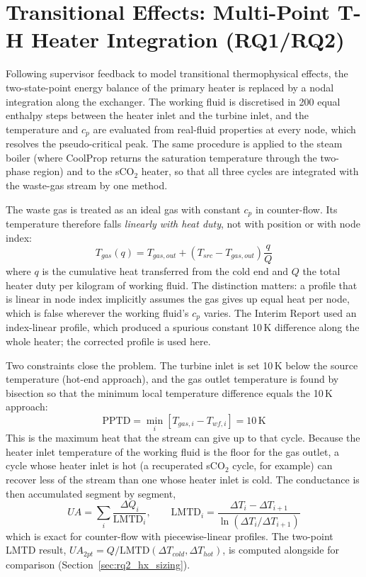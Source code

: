 \section{Transitional Effects: Multi-Point T-H Heater Integration (RQ1/RQ2)}
\label{sec:method_pinch}

Following supervisor feedback to model transitional thermophysical effects,
the two-state-point energy balance of the primary heater is replaced by a
nodal integration along the exchanger. The working fluid is discretised in
200 equal enthalpy steps between the heater inlet and the turbine inlet, and
the temperature and $c_p$ are evaluated from real-fluid properties at every
node, which resolves the pseudo-critical peak. The same procedure is applied
to the steam boiler (where CoolProp returns the saturation temperature
through the two-phase region) and to the sCO$_2$ heater, so that all three
cycles are integrated with the waste-gas stream by one method.

The waste gas is treated as an ideal gas with constant $c_p$ in counter-flow.
Its temperature therefore falls \emph{linearly with heat duty}, not with
position or with node index:
\begin{equation}
T_{gas}(q) = T_{gas,out} + \left(T_{src} - T_{gas,out}\right)\frac{q}{Q}
\label{eq:gas_profile}
\end{equation}
where $q$ is the cumulative heat transferred from the cold end and $Q$ the
total heater duty per kilogram of working fluid. The distinction matters: a
profile that is linear in node index implicitly assumes the gas gives up equal
heat per node, which is false wherever the working fluid's $c_p$ varies. The
Interim Report used an index-linear profile, which produced a spurious
constant 10\,K difference along the whole heater; the corrected profile is
used here.

Two constraints close the problem. The turbine inlet is set 10\,K below the
source temperature (hot-end approach), and the gas outlet temperature is
found by bisection so that the minimum local temperature difference equals
the 10\,K approach:
\begin{equation}
\mathrm{PPTD} = \min_{i}\!\left[T_{gas,i} - T_{wf,i}\right] = 10\,\text{K}
\label{eq:pptd}
\end{equation}
This is the maximum heat that the stream can give up to that cycle. Because
the heater inlet temperature of the working fluid is the floor for the gas
outlet, a cycle whose heater inlet is hot (a recuperated sCO$_2$ cycle, for
example) can recover less of the stream than one whose heater inlet is cold.
The conductance is then accumulated segment by segment,
\begin{equation}
UA = \sum_{i} \frac{\Delta Q_i}{\mathrm{LMTD}_i}, \qquad
\mathrm{LMTD}_i = \frac{\Delta T_{i} - \Delta T_{i+1}}{\ln(\Delta T_{i}/\Delta T_{i+1})}
\label{eq:seg_UA}
\end{equation}
which is exact for counter-flow with piecewise-linear profiles. The two-point
LMTD result, $UA_{2pt} = Q/\mathrm{LMTD}(\Delta T_{cold},\Delta T_{hot})$, is
computed alongside for comparison (Section~\ref{sec:rq2_hx_sizing}).

